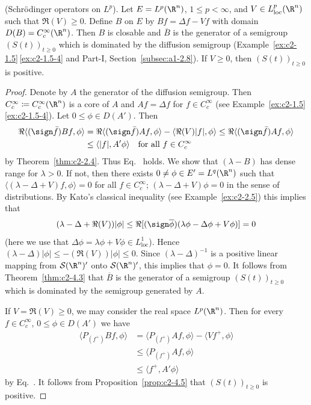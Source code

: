 \begin{example}\label{ex:c2-4.7}
(Schrödinger operators on $L^{p}$).
Let $E = L^{p}(\R^{n})$, $1 \leq p < \infty$, and $V \in L^{p}_{\text{loc}}(\R^{n})$ such that $\Re(V) \geq 0$.
Define $B$ on $E$ by $Bf = \Delta f - Vf$ with domain $D(B) = C^{\infty}_{c}(\R^{n})$. 
Then $B$ is closable and $\overline{B}$ is the generator of a semigroup $(S(t))_{t \geq 0}$ which is dominated by the diffusion semigroup (Example~\ref{ex:c2-1.5}\,\ref{ex:c2-1.5-4} and Part-I, Section~\ref{subsec:a1-2.8}). 
If\/ $V \geq 0$, then $(S(t))_{t \geq 0}$ is positive.
\end{example}

\begin{proof}
Denote by $A$ the generator of the diffusion semigroup. 
Then $C^{\infty}_{c} \coloneq C^{\infty}_{c}(\R^{n})$ is a core of\/ $A$ and $Af = \Delta f$ for $f \in C^{\infty}_{c}$ (see Example~\ref{ex:c2-1.5}\,\ref{ex:c2-1.5-4}). 
Let $0 \leq \phi \in D(A')$. Then
\begin{align*}
\Re\langle(\sign \bar{f})Bf,\phi\rangle &= \Re\langle(\sign \bar{f})Af,\phi\rangle - \langle\Re(V)|f|,\phi\rangle \leq \Re\langle(\sign \bar{f})Af,\phi\rangle\\
&\leq \langle|f|,A'\phi\rangle \quad \text{for all } f \in C^{\infty}_{c} 
\end{align*}
by Theorem~\ref{thm:c2-2.4}.
Thus Eq.~ holds.
We show that $(\lambda - B)$ has dense range for $\lambda > 0$. 
If not, then there exists $0 \neq \phi \in E' = L^{q}(\R^{n})$ such that $\langle(\lambda - \Delta + V)f,\phi\rangle = 0$ for all $f \in C^{\infty}_{c}$; \ie $(\lambda - \Delta + V)\phi = 0$ in the sense of distributions. 
By Kato's classical inequality (see Example~\ref{ex:c2-2.5}) this implies that
\[
(\lambda - \Delta + \Re(V))|\phi| \leq \Re[(\sign \overline{\phi})(\lambda\phi - \Delta\phi + V\phi)] = 0
\] 
(here we use that $\Delta\phi = \lambda\phi + V\phi \in L^{1}_{\text{loc}}$). 
Hence $(\lambda - \Delta)|\phi| \leq -(\Re(V))|\phi| \leq 0$. 
Since $(\lambda - \Delta)^{-1}$ is a positive linear mapping from $\mathcal{S}(\R^{n})'$ onto $\mathcal{S}(\R^{n})'$, this implies that $\phi = 0$. 
It follows from Theorem~\ref{thm:c2-4.3}   that $\overline{B}$ is the
generator of a semigroup $(S(t))_{t \geq 0}$ which is dominated by the semigroup generated by $A$.

If\/ $V = \Re(V) \geq 0$, we may consider the real space $L^{p}(\R^{n})$. 
Then for every $f \in C^{\infty}_{c}$, $0 \leq \phi \in D(A')$ we have
\begin{align*}
\langle P_{(f^{+})}Bf,\phi\rangle &= \langle P_{(f^{+})}Af,\phi\rangle - \langle Vf^{+},\phi\rangle\\
&\leq \langle P_{(f^{+})}Af,\phi\rangle\\
&\leq \langle f^{+},A'\phi\rangle
\end{align*}
by Eq.~. 
It follows from  Proposition~\ref{prop:c2-4.5} that $(S(t))_{t \geq 0}$ is positive.
\end{proof}

